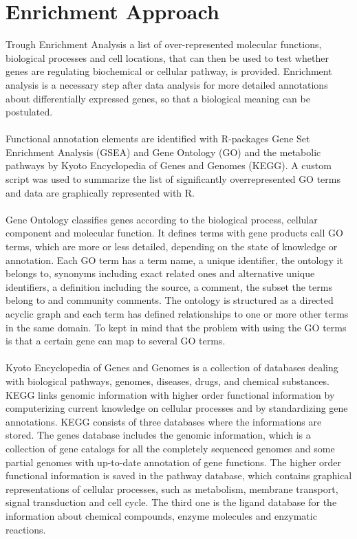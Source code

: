 \documentclass[12pt, a4paper]{report}
\begin{document}
\section{Enrichment Approach}
Trough Enrichment Analysis a list of over-represented molecular functions, biological processes and cell locations, that can then be used to test whether genes are regulating biochemical or cellular pathway, is provided. Enrichment analysis is a necessary step after data analysis for more detailed annotations about differentially expressed genes, so that a biological meaning can be postulated. \\ 
\ \\
Functional annotation elements are identified with R-packages Gene Set Enrichment Analysis (GSEA) \cite{Subramanian2005} and Gene Ontology (GO) and the metabolic pathways by Kyoto Encyclopedia of Genes and Genomes (KEGG). 
A custom script was used to summarize the list of significantly overrepresented GO terms and data are graphically represented with R. \\
\ \\
Gene Ontology classifies genes according to the biological process, cellular component and molecular function. It defines terms with gene products call GO terms, which are more or less detailed, depending on the state of knowledge or annotation. 
Each GO term has a term name, a unique identifier, the ontology it belongs to, synonyms including exact related ones and alternative unique identifiers, a definition including the source, a comment, the subset the terms belong to and community comments. The ontology is structured as a directed acyclic graph and each term has defined relationships to one or more other terms in the same domain. To kept in mind that the problem with using the GO terms is that a certain gene can map to several GO terms. \cite{Ashburner2000} \\
\ \\
Kyoto Encyclopedia of Genes and Genomes is a collection of databases dealing with biological pathways, genomes, diseases, drugs, and chemical substances. KEGG links genomic information with higher order functional information by computerizing current knowledge on cellular processes and by standardizing gene annotations. KEGG consists of three databases where the informations are stored. The genes database includes the genomic information, which is a collection of gene catalogs for all the completely sequenced genomes and some partial genomes with up-to-date annotation of gene functions. The higher order functional information is saved in the pathway database, which contains graphical representations of cellular processes, such as metabolism, membrane transport, signal transduction and cell cycle. The third one is the ligand database for the information about chemical compounds, enzyme molecules and enzymatic reactions. \cite{kanehisa2000}
\end{document}
